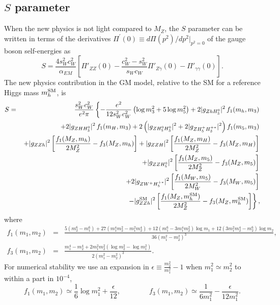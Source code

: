 \documentclass[11pt]{article}
\begin{document}
\subsection{$S$ parameter}

When the new physics is not light compared to $M_Z$, the $S$ parameter can be written in terms of the derivatives $\Pi^{\prime}(0) \equiv d \Pi(p^2)/d p^2 |_{p^2 = 0}$ of the gauge boson self-energies as
\begin{equation}
	S = \frac{4 s_W^2 c_W^2}{\alpha_{EM}} \left[\Pi'_{ZZ}(0)
	-\frac{c_W^2-s_W^2}{s_W c_W}\Pi'_{Z\gamma}(0)-\Pi'_{\gamma\gamma}(0)\right].
\end{equation}
The new physics contribution in the GM model, relative to the SM for a reference Higgs mass $m_h^{\rm SM}$, is~\cite{indirect}
\begin{eqnarray}
	S &=& \frac{s_W^2 c_W^2}{e^2\pi}
	\left\{-\frac{e^2}{12 s_W^2 c_W^2}\left(\log{m_3^2}+5\log{m_5^2}\right)
	+2|g_{ZhH_3^0}|^2\,f_1(m_h,m_3)\right. \nonumber\\
	&& \left.+ 2|g_{ZHH_3^0}|^2\,f_1(m_H,m_3)
	+2\left(|g_{ZH_5^0H_3^0}|^2+2|g_{ZH_5^+H_3^{+*}}|^2\right)f_1(m_5,m_3)\right. 
	\nonumber\\
	&&\left.+|g_{ZZh}|^2\left[\frac{f_1(M_Z,m_h)}{2 M_Z^2}-f_3(M_Z,m_h)\right]
	+|g_{ZZH}|^2\left[\frac{f_1(M_Z,m_H)}{2 M_Z^2}-f_3(M_Z,m_H)\right]\right. \nonumber\\
	&&\left.+|g_{ZZH_5^0}|^2\left[\frac{f_1(M_Z,m_5)}{2 M_Z^2}-f_3(M_Z,m_5)\right]\right. \nonumber\\
	&&\left.+2|g_{ZW^+H_5^{+*}}|^2\left[\frac{f_1(M_W,m_5)}{2 M_W^2}-f_3(M_W,m_5)\right]
	\right. \nonumber \\
	&&\left. -|g_{ZZh}^{\rm SM}|^2\left[\frac{f_1(M_Z,m_h^{\rm SM})}{2 M_Z^2}-f_3(M_Z,m_h^{\rm SM})\right] \right\},
	\label{eq:SGM}
\end{eqnarray}
where 
\begin{eqnarray}
	f_1(m_1,m_2) &=&
	\frac{5(m_2^6-m_1^6) + 27 (m_1^4 m_2^2-m_1^2 m_2^4) 
	+ 12 (m_1^6-3 m_1^4 m_2^2) \log m_1 
	+ 12(3 m_1^2 m_2^4-m_2^6)\log m_2}{36(m_1^2-m_2^2)^3}, \nonumber \\
	f_3(m_1,m_2) &=& \frac{m_1^4 - m_2^4 
	+ 2 m_1^2 m_2^2\left(\log m_2^2 - \log m_1^2\right)}{2 (m_1^2 - m_2^2 )^3}.
\end{eqnarray}
For numerical stability we use an expansion in $\epsilon \equiv \frac{m_2^2}{m_1^2} - 1$ when $m_1^2 \simeq m_2^2$ to within a part in $10^{-4}$, 
\begin{equation}
	f_1(m_1,m_2) \simeq \frac{1}{6} \log m_1^2 + \frac{\epsilon}{12}, \qquad \qquad
	f_3(m_1,m_2) \simeq \frac{1}{6 m_1^2} - \frac{\epsilon}{12 m_1^2}.
\end{equation}
\end{document}
